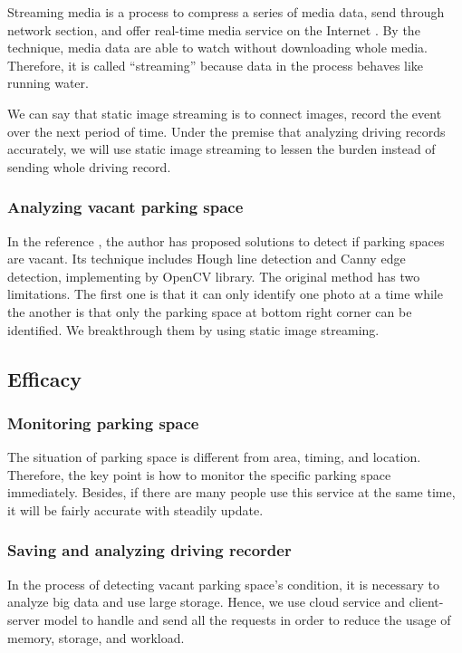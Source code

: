 \documentclass[runningheads,a4paper]{llncs}
\begin{document}
Streaming media is a process to compress a series of media data, send
through network section, and offer real-time media service on the
Internet \cite{IOV2014}. By the technique, media data are able to watch without
downloading whole media. Therefore, it is called ``streaming'' because
data in the process behaves like running water.

We can say that static image streaming is to connect images,
record the event over the next period of time. Under the premise that
analyzing driving records accurately, we will use static image streaming
to lessen the burden instead of sending whole driving record.

%
\subsubsection{Analyzing vacant parking space}
%

In the reference \cite{ParkingSpot}, the author has proposed solutions to detect if
parking spaces are vacant. Its technique includes Hough line detection
and Canny edge detection, implementing by OpenCV library. The
original method has two limitations. The first one is that it can only
identify one photo at a time while the another is that only the parking
space at bottom right corner can be identified. We breakthrough them by
using static image streaming.


%
\subsection{Efficacy}
%

%
\subsubsection{Monitoring parking space}
%

The situation of parking space is different from area, timing, and
location. Therefore, the key point is how to monitor the specific
parking space immediately. Besides, if there are many people use this
service at the same time, it will be fairly accurate with steadily
update.

%
\subsubsection{Saving and analyzing driving recorder}
%

In the process of detecting vacant parking space's condition, it is
necessary to analyze big data and use large storage. Hence, we use cloud
service and client-server model to handle and send all the requests in
order to reduce the usage of memory, storage, and workload.
\end{document}
